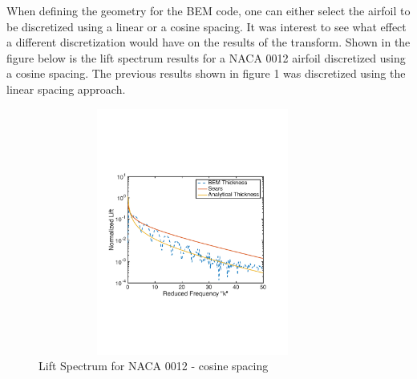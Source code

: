 \documentclass{article}
\begin{document}
\newpage

\noindent When defining the geometry for the BEM code, one can either select the airfoil to be discretized using a linear or a cosine spacing. It was interest to see what effect a different discretization would have on the results of the transform. Shown in the figure below is the lift spectrum results for a NACA 0012 airfoil discretized using a cosine spacing. The previous results shown in figure 1 was discretized using the linear spacing approach. 

\begin{figure}[h]
\includegraphics[width = 4in, height = 3.2in]{BEM_Cosine_0012}
\centering
\caption{Lift Spectrum for NACA 0012 - cosine spacing}
\end{figure}
\end{document}

